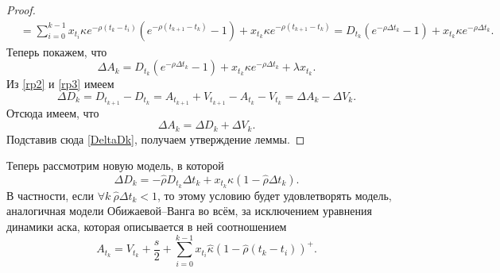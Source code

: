 \begin{appendices}
\begin{proof}
\begin{align*}
			             & = \sum _{i=0} ^{k - 1} x_{t_i} \kappa e^{- \rho (t_k - t_i)} (e^{- \rho (t_{k+1} - t_k)} - 1)
			+ x_{t_k} \kappa e^{- \rho (t_{k+1} - t_k)} = D_{t_k} (e^{- \rho \Delta t_k} - 1) + x_{t_k} \kappa e^{- \rho \Delta t_k}.
		\end{align*}
		Теперь покажем, что
		\begin{equation*}
			\Delta A_k = D_{t_k} (e^{- \rho \Delta t_k} - 1) + x_{t_k} \kappa e^{- \rho \Delta t_k} + \lambda x_{t_k} .
		\end{equation*}
		Из \eqref{rp2} и \eqref{rp3} имеем
		\begin{equation*}
			\Delta D_k = D_{t_{k+1}} - D_{t_k} = A_{t_{k+1}} + V_{t_{k+1}} - A_{t_k} - V_{t_k} = \Delta A_k - \Delta V_k.
		\end{equation*}
		Отсюда имеем, что
		\begin{equation*}
			\Delta A_k = \Delta D_k + \Delta V_k .
		\end{equation*}
		Подставив сюда \eqref{DeltaDk}, получаем утверждение леммы.
	\end{proof}

	Теперь рассмотрим новую модель, в которой
	\begin{equation*}
		\Delta D_{k} = - \hat \rho D_{t_k} \Delta t_k + x_{t_k} \hat \kappa (1 - \hat \rho \Delta t_k).
	\end{equation*}
	В частности, если $\forall k \ \hat \rho \Delta t_k < 1$, то
	этому условию будет удовлетворять модель, аналогичная модели Обижаевой--Ванга во всём,
	за исключением уравнения динамики аска, которая описывается в ней соотношением
	\begin{equation} \label{ourmodspec}
		A_{t_k} = V_{t_k} + \frac{s}{2} + \sum _{i=0} ^{k-1} x_{t_i}  \hat \kappa (1 - \hat \rho (t_k - t_i))^+.
	\end{equation}



\end{appendices}
